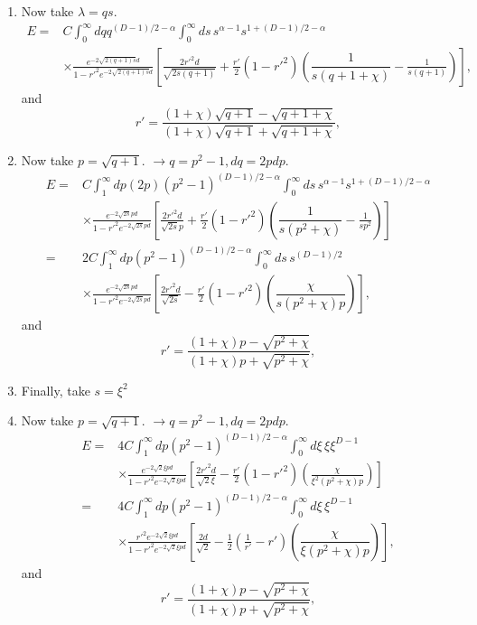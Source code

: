 \begin{enumerate}
\item Now take $\lambda = qs$.  
 \begin{align}
E=&  C\int_0^\infty dq q^{(D-1)/2-\alpha}\int_0^\infty ds\, s^{\alpha-1}s^{1+(D-1)/2-\alpha}\nonumber\\
&\times  \frac{e^{-2\sqrt{2(q+1)s}d}}{1-r'^2e^{-2\sqrt{2(q+1)s}d}}\left[
\frac{2r'^2d}{\sqrt{2s(q+1)}}+ \frac{r'}{2}(1-r'^2)\left(\dfrac{1}{s(q+1+\chi)}  -\frac{1}{s(q+1)}\right)\right],
\end{align}
and 
\begin{equation}
r' =  \frac{(1+\chi)\sqrt{q+1}-\sqrt{q+ 1 + \chi}}{(1+\chi)\sqrt{q+1}+\sqrt{q+1+\chi}},
\end{equation}
\item Now take $p = \sqrt{q+1}$.  $\rightarrow  q = p^2-1, dq = 2p dp$.  
 \begin{align}
E=&  C\int_1^\infty dp(2p) (p^2-1)^{(D-1)/2-\alpha}\int_0^\infty ds\, s^{\alpha-1}s^{1+(D-1)/2-\alpha}\nonumber\\
&\times  \frac{e^{-2\sqrt{2s}pd}}{1-r'^2e^{-2\sqrt{2s}pd}}\left[\frac{2r'^2d}{\sqrt{2s}p}+ 
\frac{r'}{2}(1-r'^2)\left(\dfrac{1}{s(p^2+\chi)}  -\frac{1}{s p^2}\right)\right]\\
=&  2C\int_1^\infty dp (p^2-1)^{(D-1)/2-\alpha}\int_0^\infty ds\, s^{(D-1)/2}\nonumber\\
&\times\frac{e^{-2\sqrt{2s}pd}}{1-r'^2e^{-2\sqrt{2s}pd}}\left[\frac{2r'^2d}{\sqrt{2s}}- 
\frac{r'}{2}(1-r'^2)\left(\dfrac{\chi}{s(p^2+\chi)p}\right)\right],
\end{align}
and 
\begin{equation}
r' =  \frac{(1+\chi)p-\sqrt{p^2 + \chi}}{(1+\chi)p+\sqrt{p^2+\chi}},
\end{equation}
\item Finally, take 
$s = \xi^2$
\item Now take $p = \sqrt{q+1}$.  $\rightarrow  q = p^2-1, dq = 2p dp$.  
 \begin{align}
E=&  4C\int_1^\infty dp (p^2-1)^{(D-1)/2-\alpha}\int_0^\infty d\xi\,\xi\xi^{D-1}\nonumber\\
&\times  \frac{e^{-2\sqrt{2}\xi pd}}{1-r'^2e^{-2\sqrt{2}\xi pd}}\left[\frac{2r'^2d}{\sqrt{2}\xi}-
 \frac{r'}{2}(1-r'^2)\left(\frac{ \chi}{\xi^2(p^2+\chi)p}\right)\right]\\
=&  4C\int_1^\infty dp (p^2-1)^{(D-1)/2-\alpha}\int_0^\infty d\xi\,\xi^{D-1}\nonumber\\
&\times  \frac{r'^2e^{-2\sqrt{2}\xi pd}}{1-r'^2e^{-2\sqrt{2}\xi pd}}\left[\frac{2d}{\sqrt{2}}-
 \frac{1}{2}\left(\frac{1}{r'}-r'\right)\left(\dfrac{\chi}{\xi(p^2+\chi)p}\right)\right],
\end{align}
and 
\begin{equation}
r' =  \frac{(1+\chi)p-\sqrt{p^2 + \chi}}{(1+ \chi)p+\sqrt{p^2+\chi}},
\end{equation}


\end{enumerate}

